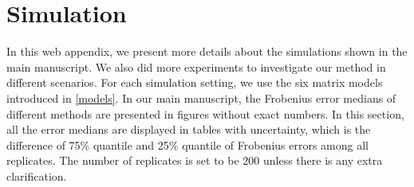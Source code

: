 \documentclass[useAMS,referee,usenatbib]{biom}
\begin{document}
\pagebreak
\appendix
\section*{Simulation} 
In this web appendix, we present more details about the simulations shown in the main manuscript. We also did more experiments to investigate our method in different scenarios. For each simulation setting, we use the six matrix models introduced in \ref{models}. In our main manuscript, the Frobenius error medians of different methods are presented in figures without exact numbers. In this section, all the error medians are displayed in tables with uncertainty, which is the difference of 75\% quantile and 25\% quantile of Frobenius errors among all replicates. The number of replicates is set to be 200 unless there is any extra clarification.
\end{document}
